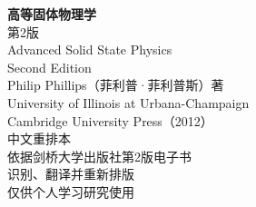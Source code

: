 \documentclass[11pt,a4paper,twoside,openright]{ctexbook}
\begin{document}
\frontmatter
\begin{titlepage}
\centering
{\Huge\bfseries 高等固体物理学\\[1.2em]}
{\LARGE 第2版\\[5em]}
{\Large Advanced Solid State Physics\\
Second Edition\\[3em]}
{\Large Philip Phillips（菲利普·菲利普斯）\quad 著\\[1em]}
{\large University of Illinois at Urbana-Champaign\\[2em]}
{\large Cambridge University Press（2012）\\[5em]}
{\large 中文重排本\\[0.5em]}
{\large 依据剑桥大学出版社第2版电子书\\[0.3em]
识别、翻译并重新排版\\[0.3em]
仅供个人学习研究使用\\[3em]}
\end{titlepage}
\thispagestyle{empty}\mbox{}\clearpage


\tableofcontents

\mainmatter

















\end{document}
